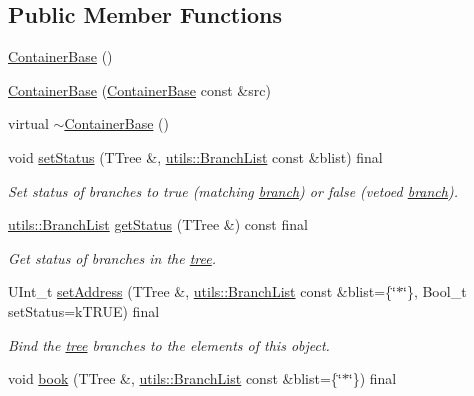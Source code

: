 \subsection*{Public Member Functions}
\begin{DoxyCompactItemize}
\item 
\hyperlink{classpanda_1_1ContainerBase_a9de9e1e291c477a7ee786ce5b8ba55a9}{ContainerBase} ()
\item 
\hyperlink{classpanda_1_1ContainerBase_a5870d70160f2b3ffebf1f2e215d8e8ab}{ContainerBase} (\hyperlink{classpanda_1_1ContainerBase}{ContainerBase} const \&src)
\item 
virtual \hyperlink{classpanda_1_1ContainerBase_a189c00e40c4146e922578ce665396466}{$\sim$ContainerBase} ()
\item 
void \hyperlink{classpanda_1_1ContainerBase_ac3eae6e2461489f5453fe0680dc2481c}{setStatus} (TTree \&, \hyperlink{classpanda_1_1utils_1_1BranchList}{utils::BranchList} const \&blist) final
\begin{DoxyCompactList}\small\item\em Set status of branches to true (matching \hyperlink{namespacepanda_1_1branch}{branch}) or false (vetoed \hyperlink{namespacepanda_1_1branch}{branch}). \item\end{DoxyCompactList}\item 
\hyperlink{classpanda_1_1utils_1_1BranchList}{utils::BranchList} \hyperlink{classpanda_1_1ContainerBase_a0fc7be3775bfe31f3819356d1cacda11}{getStatus} (TTree \&) const final
\begin{DoxyCompactList}\small\item\em Get status of branches in the \hyperlink{namespacepanda_1_1tree}{tree}. \item\end{DoxyCompactList}\item 
UInt\_\-t \hyperlink{classpanda_1_1ContainerBase_ad5fdf0c76a93e2c5ae563ad34b268e43}{setAddress} (TTree \&, \hyperlink{classpanda_1_1utils_1_1BranchList}{utils::BranchList} const \&blist=\{\char`\"{}$\ast$\char`\"{}\}, Bool\_\-t setStatus=kTRUE) final
\begin{DoxyCompactList}\small\item\em Bind the \hyperlink{namespacepanda_1_1tree}{tree} branches to the elements of this object. \item\end{DoxyCompactList}\item 
void \hyperlink{classpanda_1_1ContainerBase_a940f2c42e10910ba3bc87369347cc97d}{book} (TTree \&, \hyperlink{classpanda_1_1utils_1_1BranchList}{utils::BranchList} const \&blist=\{\char`\"{}$\ast$\char`\"{}\}) final

\end{DoxyCompactItemize}
